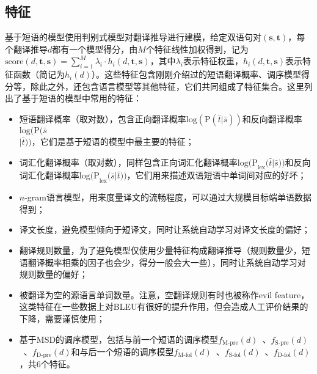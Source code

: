 \subsection{特征}

\parinterval 基于短语的模型使用判别式模型对翻译推导进行建模，给定双语句对$(\mathbf{s},\mathbf{t})$，每个翻译推导$d$都有一个模型得分，由$M$个特征线性加权得到，记为$\textrm{score}(d,\mathbf{t},\mathbf{s}) = \sum_{i=1}^{M} \lambda_i \cdot h_i (d,\mathbf{t},\mathbf{s})$，其中$\lambda_i$表示特征权重，$h_i (d,\mathbf{t},\mathbf{s})$表示特征函数（简记为$h_i (d)$）。这些特征包含刚刚介绍过的短语翻译概率、调序模型得分等，除此之外，还包含语言模型等其他特征，它们共同组成了特征集合。这里列出了基于短语的模型中常用的特征：

\begin{itemize}
\vspace{0.5em}
\item 短语翻译概率（取对数），包含正向翻译概率$\textrm{log}(\textrm{P}(\bar{t}|\bar{s}))$和反向翻译概率$\textrm{log}(\textrm{P}(\bar{s}$\\$|\bar{t}))$，它们是基于短语的模型中最主要的特征；
\vspace{0.5em}
\item 词汇化翻译概率（取对数），同样包含正向词汇化翻译概率$\textrm{log(P}_{\textrm{lex}}(\bar{t}|\bar{s}\textrm{))}$和反向词汇化翻译概率$\textrm{log(P}_{\textrm{lex}}(\bar{s}|\bar{t}\textrm{))}$，它们用来描述双语短语中单词间对应的好坏；
\vspace{0.5em}
\item $n$-gram语言模型，用来度量译文的流畅程度，可以通过大规模目标端单语数据得到；
\vspace{0.5em}
\item 译文长度，避免模型倾向于短译文，同时让系统自动学习对译文长度的偏好；
\vspace{0.5em}
\item 翻译规则数量，为了避免模型仅使用少量特征构成翻译推导（规则数量少，短语翻译概率相乘的因子也会少，得分一般会大一些），同时让系统自动学习对规则数量的偏好；
\vspace{0.5em}
\item 被翻译为空的源语言单词数量。注意，空翻译规则有时也被称作evil feature，这类特征在一些数据上对BLEU有很好的提升作用，但会造成人工评价结果的下降，需要谨慎使用；
\vspace{0.5em}
\item 基于MSD的调序模型，包括与前一个短语的调序模型$f_{\textrm{M-pre}}(d)$\ 、$f_{\textrm{S-pre}}(d)$\ 、$f_{\textrm{D-pre}}(d)$和与后一个短语的调序模型$f_{\textrm{M-fol}}(d)$\ 、$f_{\textrm{S-fol}}(d)$\ 、$f_{\textrm{D-fol}}(d)$，共6个特征。
\vspace{0.5em}
\end{itemize}

